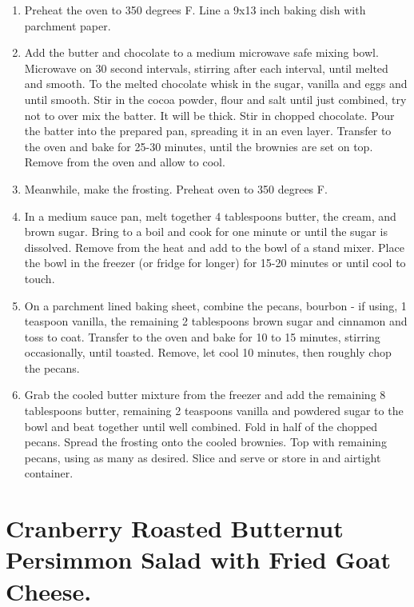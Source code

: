 \documentclass[
  letterpaper,
  DIV=11,
  numbers=noendperiod,
  titlepage=false]{scrreprt}
\providecommand{\tightlist}{%
  \setlength{\itemsep}{0pt}\setlength{\parskip}{0pt}}\usepackage{longtable,booktabs,array}
\begin{document}
\begin{enumerate}
\def\labelenumi{\arabic{enumi}.}
\tightlist
\item
  Preheat the oven to 350 degrees F. Line a 9x13 inch baking dish with
  parchment paper.
\item
  Add the butter and chocolate to a medium microwave safe mixing bowl.
  Microwave on 30 second intervals, stirring after each interval, until
  melted and smooth. To the melted chocolate whisk in the sugar, vanilla
  and eggs and until smooth. Stir in the cocoa powder, flour and salt
  until just combined, try not to over mix the batter. It will be thick.
  Stir in chopped chocolate. Pour the batter into the prepared pan,
  spreading it in an even layer. Transfer to the oven and bake for 25-30
  minutes, until the brownies are set on top. Remove from the oven and
  allow to cool.
\item
  Meanwhile, make the frosting. Preheat oven to 350 degrees F.
\item
  In a medium sauce pan, melt together 4 tablespoons butter, the cream,
  and brown sugar. Bring to a boil and cook for one minute or until the
  sugar is dissolved. Remove from the heat and add to the bowl of a
  stand mixer. Place the bowl in the freezer (or fridge for longer) for
  15-20 minutes or until cool to touch.
\item
  On a parchment lined baking sheet, combine the pecans, bourbon - if
  using, 1 teaspoon vanilla, the remaining 2 tablespoons brown sugar and
  cinnamon and toss to coat. Transfer to the oven and bake for 10 to 15
  minutes, stirring occasionally, until toasted. Remove, let cool 10
  minutes, then roughly chop the pecans.
\item
  Grab the cooled butter mixture from the freezer and add the remaining
  8 tablespoons butter, remaining 2 teaspoons vanilla and powdered sugar
  to the bowl and beat together until well combined. Fold in half of the
  chopped pecans. Spread the frosting onto the cooled brownies. Top with
  remaining pecans, using as many as desired. Slice and serve or store
  in and airtight container.
\end{enumerate}


\chapter{Cranberry Roasted Butternut Persimmon Salad with Fried Goat
Cheese.}\label{cranberry-roasted-butternut-persimmon-salad-with-fried-goat-cheese.}
\end{document}

